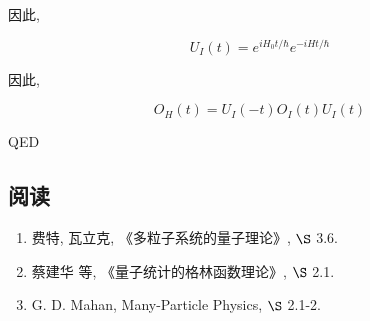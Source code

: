 因此,

\begin{equation*}
    U_I (t) = e^{iH_0t/\hbar}e^{-iHt/\hbar}
\end{equation*}

因此,

\begin{equation*}
O_H (t) = U_I(-t)O_I(t)U_I(t)
\end{equation*}

QED

\subsection*{阅读}

\begin{enumerate}

  \item 费特, 瓦立克, 《多粒子系统的量子理论》, $\S$ 3.6.

  \item 蔡建华 等, 《量子统计的格林函数理论》, $\S$ 2.1.

  \item G. D. Mahan, Many-Particle Physics, $\S$ 2.1-2.

\end{enumerate}